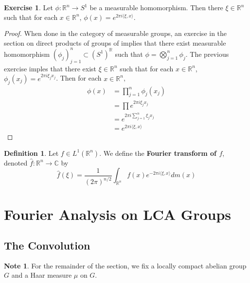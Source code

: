 \documentclass[12pt]{amsart}
\theoremstyle{definition}
\newtheorem{defn}[definition]{Definition}
\newtheorem{note}[definition]{Note}
\newtheorem{ex}[definition]{Exercise}
\newcommand{\C}{\mathbb{C}}
\newcommand{\R}{\mathbb{R}}
\renewcommand{\r}{\rangle}
\renewcommand{\l}{\langle}
\newcommand{\lex}[1]{\label{ex:#1}}
\newcommand{\ld}[1]{\label{defn:#1}}
\begin{document}
	\begin{ex}
	\lex{301} Let $\phi: \R^n \rightarrow S^1$ be a measurable homomorphism. Then there $\xi \in \R^n$ such that for each $x \in \R^n$, $\phi(x) = e^{2 \pi i \l \xi, x\r}$. 
	\end{ex}	
	
	\begin{proof}
	When done in the category of measurable groups, an exercise in the section on direct products of groups of \cite{groups}
	implies that there exist measurable homomorphism $(\phi_{j})_{j=1}^n \subset (S^1)^{\R}$ such that $\phi = \bigotimes_{j=1}^n \phi_j$. The previous exercise imples that there exist $\xi \in \R^n$ such that for each $x \in \R^n$, $\phi_j(x_j) = e^{2 \pi i \xi_j x_j}$. Then for each $x \in \R^n$, 
	\begin{align*}
	\phi(x)
	&= \prod_{j=1}^n \phi_j(x_j) \\
	&= \prod e^{2 \pi i \xi_j x_j} \\
	&= e^{2 \pi i \sum\limits_{j=1}^n  \xi_j x_j }\\
	&= e^{2 \pi i \l \xi, x \r}
	\end{align*}
	\end{proof}
	
	\begin{defn}
	\ld{302} Let $f \in L^1(\R^n)$. We define the \textbf{Fourier transform of $f$}, denoted $\hat{f}: \R^n \rightarrow \C$ by 
	$$\hat{f}(\xi) = \frac{1}{(2 \pi)^{n / 2}} \int_{\R^n} f(x) e^{- 2 \pi i \l \xi , x\r} dm(x)$$
	\end{defn}
	
	
	
	
	
	
	
	
	
	
	
	
	
	
	\newpage
	\section{Fourier Analysis on LCA Groups}
	
	
	

	\subsection{The Convolution}	
	\begin{note}
	For the remainder of the section, we fix a locally compact abelian group $G$ and a Haar measure $\mu$ on $G$. 
	\end{note}
	
\end{document}
